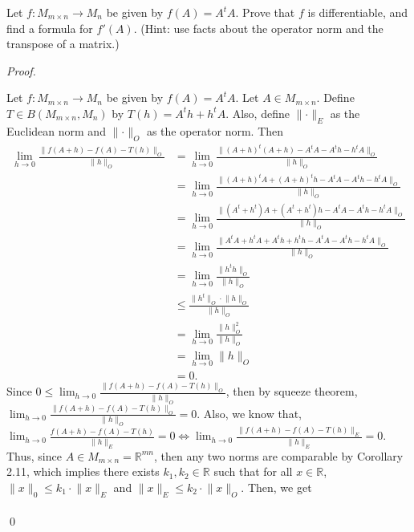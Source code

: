 \documentclass[12pt]{article}
\newenvironment{problem}[2][Problem]{\begin{trivlist}
\item[\hskip \labelsep {\bfseries #1}\hskip \labelsep {\bfseries
#2.}]}{\end{trivlist}}
\newenvironment{sol}
    {\emph{Proof.}
    }
    {
    \qed
    }
\begin{document}
\begin{problem}{5} 
  Let $f : M_{m \times n} \to M_n$ be given by $f(A) = A^tA$. Prove that $f$ is differentiable, and find a formula for $f'(A)$. (Hint: use facts about the operator norm and the transpose of a matrix.)
  \end{problem}
  \begin{sol}
  Let $f : M_{m \times n} \to M_n$ be given by $f(A) = A^tA$. Let $A \in M_{m \times n}$. Define $T \in B(M_{m \times n}, M_n)$ by $T(h) = A^th + h^tA$. Also, define $\lVert \cdot \rVert_E$ as the Euclidean norm and $\lVert \cdot \rVert_O$ as the operator norm.  Then \begin{align*}
      \lim_{h \to 0} \frac{\lVert f(A + h) - f(A) - T(h)\rVert_O}{\lVert h \rVert_O} &= \lim_{h \to 0} \frac{\lVert (A+h)^t(A+h) - A^tA - A^th - h^tA \rVert_O}{\lVert h \rVert_O} \tag*{(Definition of $f$ and $T$)} \\ &= \lim_{h \to 0} \frac{\lVert (A+h)^tA + (A+h)^th - A^tA - A^th - h^tA \rVert_O}{\lVert h \rVert_O} \tag*{(By distribution)} \\ &= \lim_{h \to 0} \frac{\lVert (A^t+h^t)A + (A^t+h^t)h - A^tA - A^th - h^tA \rVert_O}{\lVert h \rVert_O} \tag*{(Property of transpose)} \\ &= \lim_{h \to 0} \frac{\lVert A^tA+h^tA + A^th+h^th - A^tA - A^th - h^tA \rVert_O}{\lVert h \rVert_O} \tag*{(By distribution)} \\ &= \lim_{h \to 0} \frac{\lVert h^th \rVert_O}{\lVert h \rVert_O} \tag*{(By subtraction)} \\ &\leq \frac{\lVert h^t \rVert_O \cdot \lVert h \rVert_O}{\lVert h \rVert_O} \tag*{(Property of operator norm)} \\ &= \lim_{h \to 0} \frac{\lVert h \rVert_O^2}{\lVert h \rVert_O} \tag*{(Property of operator norm)} \\ &= \lim_{h \to 0} \lVert h \rVert_O \\ &= 0.
  \end{align*}
  Since $0 \leq \lim_{h \to 0} \frac{\lVert f(A + h) - f(A) - T(h)\rVert_O}{\lVert h \rVert_O}$, then by squeeze theorem, $\lim_{h \to 0} \frac{\lVert f(A + h) - f(A) - T(h)\rVert_O}{\lVert h \rVert_O} = 0$. Also, we know that, $\lim_{h \to 0} \frac{f(A+h) - f(A) - T(h)}{\lVert h \rVert_E} = 0 \Longleftrightarrow\lim_{h \to 0} \frac{\lVert f(A + h) - f(A) - T(h)\rVert_E}{\lVert h \rVert_E} = 0$. Thus, since $A \in M_{m \times n} = \mathbb{R}^{mn}$, then any two norms are comparable by Corollary 2.11, which implies there exists $k_1,k_2 \in \mathbb{R}$ such that for all $x \in \mathbb{R}$, $\lVert x \rVert_0 \leq k_1 \cdot \lVert x \rVert_E$ and $\lVert x \rVert_E \leq k_2 \cdot \lVert x \rVert_O$. Then, we get \begin{align*}

\end{align*}
\end{sol}
\end{document}
